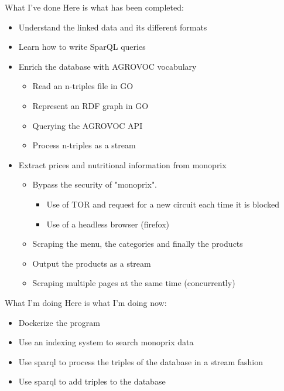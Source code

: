 \documentclass[10pt]{beamer}
\begin{document}
\begin{frame}{What I've done}
    Here is what has been completed:
	\begin{itemize}
		\item Understand the linked data and its different formats
		\item Learn how to write SparQL queries
		\item Enrich the database with AGROVOC vocabulary
		\begin{itemize}
		    \item Read an n-triples file in GO
		    \item Represent an RDF graph in GO
		    \item Querying the AGROVOC API
		    \item Process n-triples as a stream
		\end{itemize}
		\item Extract prices and nutritional information from monoprix
		\begin{itemize}
		    \item Bypass the security of "monoprix".
		    \begin{itemize}
		        \item Use of TOR and request for a new circuit each time it is blocked
		        \item Use of a headless browser (firefox)
		    \end{itemize}
		    \item Scraping the menu, the categories and finally the products
		    \item Output the products as a stream
		    \item Scraping multiple pages at the same time (concurrently)
		\end{itemize}
	\end{itemize}
\end{frame}

\begin{frame}{What I'm doing}
    Here is what I'm doing now:
    \begin{itemize}
        \item Dockerize the program
        \item Use an indexing system to search monoprix data
        \item Use sparql to process the triples of the database in a stream fashion
        \item Use sparql to add triples to the database
    \end{itemize}
\end{frame}
\end{document}

